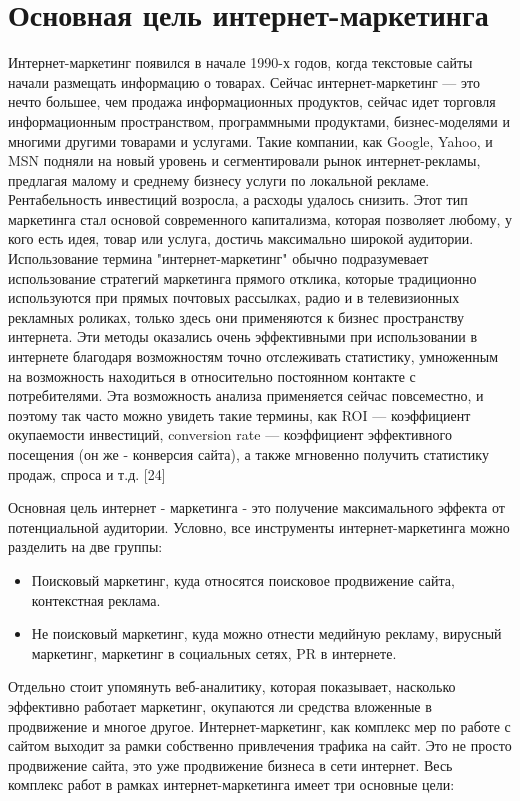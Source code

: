 \documentclass[a4paper,english,russian]{G2-105}
\begin{document}
\section{Основная цель интернет-маркетинга}
\par Интернет-маркетинг появился в начале 1990-х годов, когда текстовые сайты начали размещать информацию о товарах. Сейчас интернет-маркетинг --- это нечто большее, чем продажа информационных продуктов, сейчас идет торговля информационным пространством, программными продуктами, бизнес-моделями и многими другими товарами и услугами. Такие компании, как Google, Yahoo, и MSN подняли на новый уровень и сегментировали рынок интернет-рекламы, предлагая малому и среднему бизнесу услуги по локальной рекламе. Рентабельность инвестиций возросла, а расходы удалось снизить. Этот тип маркетинга стал основой современного капитализма, которая позволяет любому, у кого есть идея, товар или услуга, достичь максимально широкой аудитории. Использование термина "интернет-маркетинг" обычно подразумевает использование стратегий маркетинга прямого отклика, которые традиционно используются при прямых почтовых рассылках, радио и в телевизионных рекламных роликах, только здесь они применяются к бизнес пространству интернета. Эти методы оказались очень эффективными при использовании в интернете благодаря возможностям точно отслеживать статистику, умноженным на возможность находиться в относительно постоянном контакте с потребителями. Эта возможность анализа применяется сейчас повсеместно, и поэтому так часто можно увидеть такие термины, как ROI --- коэффициент окупаемости инвестиций, conversion rate --- коэффициент эффективного посещения (он же - конверсия сайта), а также мгновенно получить статистику продаж, спроса и т.д. [24]
\par Основная цель интернет - маркетинга - это получение максимального эффекта от потенциальной аудитории. Условно, все инструменты интернет-маркетинга можно разделить на две группы:
\begin{itemize}
\item Поисковый маркетинг, куда относятся поисковое продвижение сайта, контекстная реклама.
\item Не поисковый маркетинг, куда можно отнести медийную рекламу, вирусный маркетинг, маркетинг в социальных сетях, PR в интернете.
\end{itemize}
\par Отдельно стоит упомянуть веб-аналитику, которая показывает, насколько эффективно работает маркетинг, окупаются ли средства вложенные в продвижение и многое другое. Интернет-маркетинг, как комплекс мер по работе с сайтом выходит за рамки собственно привлечения трафика на сайт. Это не просто продвижение сайта, это уже продвижение бизнеса в сети интернет. Весь комплекс работ в рамках интернет-маркетинга имеет три основные цели:
\end{document}
